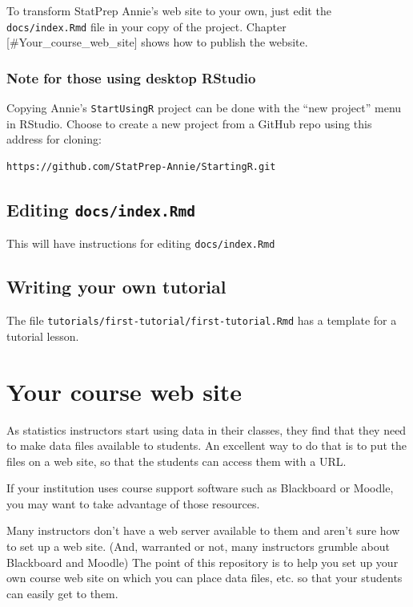 \documentclass[]{book}
\theoremstyle{definition}
\theoremstyle{definition}
\theoremstyle{definition}
\theoremstyle{remark}
\begin{document}
To transform StatPrep Annie's web site to your own, just edit the
\texttt{docs/index.Rmd} file in your copy of the project. Chapter
{[}\#Your\_course\_web\_site{]} shows how to publish the website.

\subsection{Note for those using desktop
RStudio}\label{note-for-those-using-desktop-rstudio}

Copying Annie's \texttt{StartUsingR} project can be done with the ``new
project'' menu in RStudio. Choose to create a new project from a GitHub
repo using this address for cloning:

\begin{verbatim}
https://github.com/StatPrep-Annie/StartingR.git
\end{verbatim}

\section{\texorpdfstring{Editing
\texttt{docs/index.Rmd}}{Editing docs/index.Rmd}}\label{editing-docsindex.rmd}

This will have instructions for editing \texttt{docs/index.Rmd}

\section{Writing your own tutorial}\label{writing-your-own-tutorial}

The file \texttt{tutorials/first-tutorial/first-tutorial.Rmd} has a
template for a tutorial lesson.

\chapter{Your course web site}\label{your-course-web-site}

As statistics instructors start using data in their classes, they find
that they need to make data files available to students. An excellent
way to do that is to put the files on a web site, so that the students
can access them with a URL.

If your institution uses course support software such as Blackboard or
Moodle, you may want to take advantage of those resources.

Many instructors don't have a web server available to them and aren't
sure how to set up a web site. (And, warranted or not, many instructors
grumble about Blackboard and Moodle) The point of this repository is to
help you set up your own course web site on which you can place data
files, etc. so that your students can easily get to them.
\end{document}
